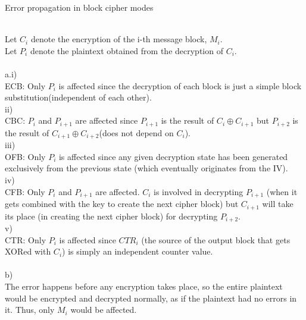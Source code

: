 \documentclass{assignment}
\begin{document}
\begin{problemlist}
\pbitem Error propagation in block cipher modes
\begin{problem}
\begin{answer}
\\
Let $C_i$ denote the encryption of the i-th message block, $M_i$.\\
Let $P_i$ denote the plaintext obtained from the decryption of $C_i$.\\
\\
a.i)\\
ECB: Only $P_i$ is affected since the decryption of each block is just a simple block substitution(independent of each other).\\
ii)\\CBC: $P_i$ and $P_{i+1}$ are affected since $P_{i+1}$ is the result of $C_i \oplus C_{i+1}$ but $P_{i+2}$ is the result of  $C_{i+1} \oplus C_{i+2}$(does not depend on $C_i$).\\
iii)\\
OFB: Only $P_i$ is affected since any given decryption state has been generated exclusively from the previous state (which eventually originates from the IV).\\
iv)\\
CFB: Only $P_i$ and $P_{i+1}$ are affected.  $C_i$ is involved in decrypting $P_{i+1}$ (when it gets combined with the key to create the next cipher block) but $C_{i+1}$ will take its place (in creating the next cipher block) for decrypting $P_{i+2}$.\\
v)\\
CTR: Only $P_i$ is affected since $CTR_i$ (the source of the output block that gets XORed with $C_i$) is simply an independent counter value.\\
\\
b)\\
The error happens before any encryption takes place, so the entire plaintext would be encrypted and decrypted normally, as if the plaintext had no errors in it.  Thus, only $M_i$ would be affected.\\
\\
\end{answer}
\end{problem}


\end{problemlist}
\end{document}

